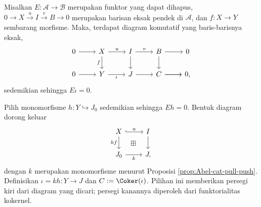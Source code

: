\begin{lema}\label{prop:erasable-aux}
	Misalkan $E: \mathcal{A} \to \mathcal{B}$ merupakan funktor yang dapat dihapus, $0 \to X \xrightarrow{u} I \xrightarrow{v} B \to 0$ merupakan barisan eksak pendek di $\mathcal{A}$, dan $f: X \to Y$ sembarang morfisme. Maka, terdapat diagram komutatif yang baris-barisnya eksak,
	\begin{equation*}\begin{tikzcd}
			0 \arrow[r] & X \arrow[d, "f"'] \arrow[r, "u"] & I \arrow[r, "v"] \arrow[d] & B \arrow[d] \arrow[r] & 0 \\
			0 \arrow[r] & Y \arrow[r, "\iota"'] & J \arrow[r] & \arrow[r] C \arrow[r] & 0 ,
	\end{tikzcd}\end{equation*}
	sedemikian sehingga $E\iota = 0$.
\end{lema}
\begin{bukti}
	Pilih monomorfisme $h: Y \hookrightarrow J_0$ sedemikian sehingga $Eh = 0$. Bentuk diagram dorong keluar
	\[\begin{tikzcd}
		X \arrow[hookrightarrow, r, "u"] \arrow[d, "hf"'] & I \arrow[d] \\
		J_0 \arrow[r, "k"'] & J \arrow[phantom, lu, "\boxplus" description] ,
	\end{tikzcd}\]
		dengan $k$ merupakan monomorfisme menurut Proposisi \ref{prop:Abel-cat-pull-push}. Definisikan $\iota = kh: Y \to J$ dan $C := \Coker(\iota)$. Pilihan ini memberikan persegi kiri dari diagram yang dicari; persegi kanannya diperoleh dari funktorialitas kokernel.
\end{bukti}

